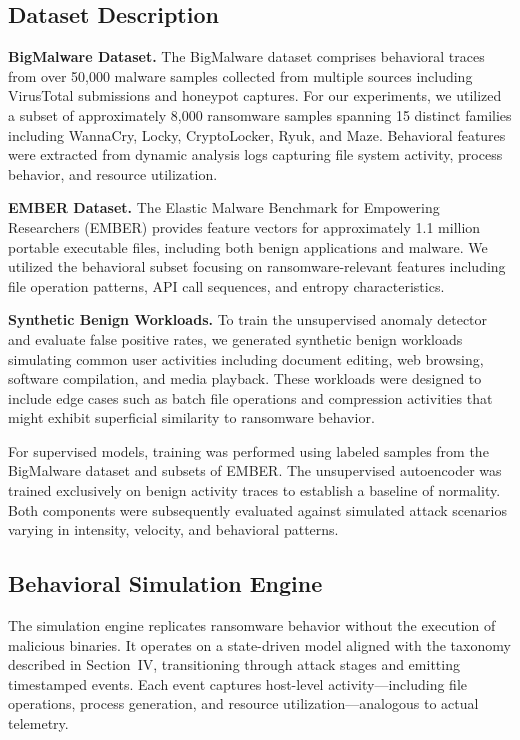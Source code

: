 \subsection{Dataset Description}

\textbf{BigMalware Dataset.} The BigMalware dataset comprises behavioral traces from over 50,000 malware samples collected from multiple sources including VirusTotal submissions and honeypot captures. For our experiments, we utilized a subset of approximately 8,000 ransomware samples spanning 15 distinct families including WannaCry, Locky, CryptoLocker, Ryuk, and Maze. Behavioral features were extracted from dynamic analysis logs capturing file system activity, process behavior, and resource utilization.

\textbf{EMBER Dataset.} The Elastic Malware Benchmark for Empowering Researchers (EMBER) \cite{anderson2018ember} provides feature vectors for approximately 1.1 million portable executable files, including both benign applications and malware. We utilized the behavioral subset focusing on ransomware-relevant features including file operation patterns, API call sequences, and entropy characteristics.

\textbf{Synthetic Benign Workloads.} To train the unsupervised anomaly detector and evaluate false positive rates, we generated synthetic benign workloads simulating common user activities including document editing, web browsing, software compilation, and media playback. These workloads were designed to include edge cases such as batch file operations and compression activities that might exhibit superficial similarity to ransomware behavior.

For supervised models, training was performed using labeled samples from the BigMalware dataset and subsets of EMBER. The unsupervised autoencoder was trained exclusively on benign activity traces to establish a baseline of normality. Both components were subsequently evaluated against simulated attack scenarios varying in intensity, velocity, and behavioral patterns.

\subsection{Behavioral Simulation Engine}

The simulation engine replicates ransomware behavior without the execution of malicious binaries. It operates on a state-driven model aligned with the taxonomy described in Section~IV, transitioning through attack stages and emitting timestamped events. Each event captures host-level activity—including file operations, process generation, and resource utilization—analogous to actual telemetry.

